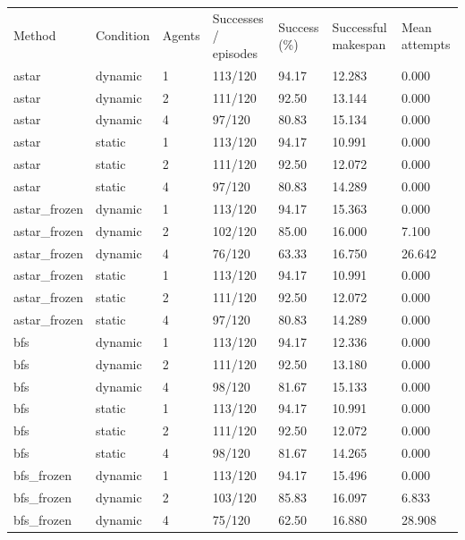 \documentclass[10pt,a4paper]{article}
\begin{document}
{\footnotesize\begin{longtable}{p{}p{}p{}p{}p{}p{}p{}}
Method & Condition & Agents & Successes / episodes & Success (\%) & Successful makespan & Mean attempts \\
astar & dynamic & 1 & 113/120 & 94.17 & 12.283 & 0.000 \\
astar & dynamic & 2 & 111/120 & 92.50 & 13.144 & 0.000 \\
astar & dynamic & 4 & 97/120 & 80.83 & 15.134 & 0.000 \\
astar & static & 1 & 113/120 & 94.17 & 10.991 & 0.000 \\
astar & static & 2 & 111/120 & 92.50 & 12.072 & 0.000 \\
astar & static & 4 & 97/120 & 80.83 & 14.289 & 0.000 \\
astar\_frozen & dynamic & 1 & 113/120 & 94.17 & 15.363 & 0.000 \\
astar\_frozen & dynamic & 2 & 102/120 & 85.00 & 16.000 & 7.100 \\
astar\_frozen & dynamic & 4 & 76/120 & 63.33 & 16.750 & 26.642 \\
astar\_frozen & static & 1 & 113/120 & 94.17 & 10.991 & 0.000 \\
astar\_frozen & static & 2 & 111/120 & 92.50 & 12.072 & 0.000 \\
astar\_frozen & static & 4 & 97/120 & 80.83 & 14.289 & 0.000 \\
bfs & dynamic & 1 & 113/120 & 94.17 & 12.336 & 0.000 \\
bfs & dynamic & 2 & 111/120 & 92.50 & 13.180 & 0.000 \\
bfs & dynamic & 4 & 98/120 & 81.67 & 15.133 & 0.000 \\
bfs & static & 1 & 113/120 & 94.17 & 10.991 & 0.000 \\
bfs & static & 2 & 111/120 & 92.50 & 12.072 & 0.000 \\
bfs & static & 4 & 98/120 & 81.67 & 14.265 & 0.000 \\
bfs\_frozen & dynamic & 1 & 113/120 & 94.17 & 15.496 & 0.000 \\
bfs\_frozen & dynamic & 2 & 103/120 & 85.83 & 16.097 & 6.833 \\
bfs\_frozen & dynamic & 4 & 75/120 & 62.50 & 16.880 & 28.908 \\

\end{longtable}}
\end{document}
